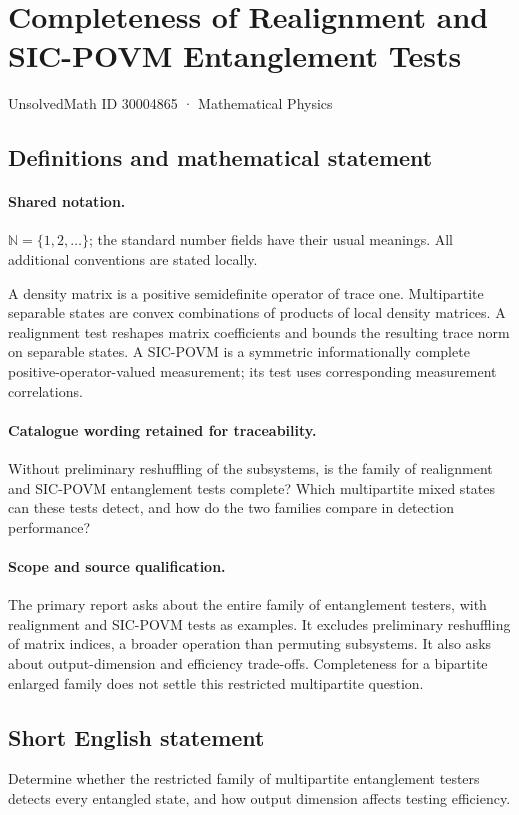 \documentclass[11pt]{article}
\begin{document}
\setcounter{section}{30004864}
\section{Completeness of Realignment and SIC-POVM Entanglement Tests}\label{30004865}
{\small UnsolvedMath ID 30004865 · Mathematical Physics}
\subsection{Definitions and mathematical statement}

\paragraph{Shared notation.}$\mathbb N=\{1,2,\ldots\}$; the standard number fields have their usual meanings. All additional conventions are stated locally.


A density matrix is a positive semidefinite operator of trace one. Multipartite separable states are convex combinations of products of local density matrices. A realignment test reshapes matrix coefficients and bounds the resulting trace norm on separable states. A SIC-POVM is a symmetric informationally complete positive-operator-valued measurement; its test uses corresponding measurement correlations.

\paragraph{Catalogue wording retained for traceability.}
Without preliminary reshuffling of the subsystems, is the family of realignment and SIC-POVM entanglement tests complete? Which multipartite mixed states can these tests detect, and how do the two families compare in detection performance?

\paragraph{Scope and source qualification.}The primary report asks about the entire family of entanglement testers, with realignment and SIC-POVM tests as examples. It excludes preliminary reshuffling of matrix indices, a broader operation than permuting subsystems. It also asks about output-dimension and efficiency trade-offs. Completeness for a bipartite enlarged family does not settle this restricted multipartite question.
\subsection{Short English statement}
Determine whether the restricted family of multipartite entanglement testers detects every entangled state, and how output dimension affects testing efficiency.
\end{document}
